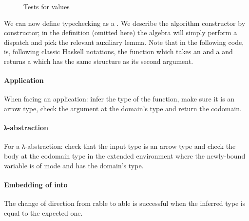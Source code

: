 \begin{figure}[h]
\begin{minipage}[t]{0.45\textwidth}
\end{minipage}\hfill
\begin{minipage}[t]{0.45\textwidth}
\end{minipage}
\caption{Tests for  values}
\end{figure}

We can now define typechecking as a \semrec{}. We describe the algorithm constructor
by constructor; in the  definition (omitted here) the algebra will
simply perform a dispatch and pick the relevant auxiliary lemma. Note that in the
following code, \AF{\_<\$\_} is, following classic Haskell notations, the function
which takes an  and a { } and returns a { }
which has the same structure as its second argument.

\paragraph{Application} When facing an application: infer the type of the function,
make sure it is an arrow type, check the argument at the domain's type and return
the codomain.
\begin{agdasnippet}
\end{agdasnippet}
%
\paragraph{λ-abstraction} For a λ-abstraction: check that the input
type is an arrow type and check the body at the codomain type in the extended
environment where the newly-bound variable is of mode  and has the
domain's type.
\begin{agdasnippet}
\end{agdasnippet}
%
\paragraph{Embedding of  into } The change of
direction from rable to able is successful when the
inferred type is equal to the expected one.
\begin{agdasnippet}
\end{agdasnippet}
%
